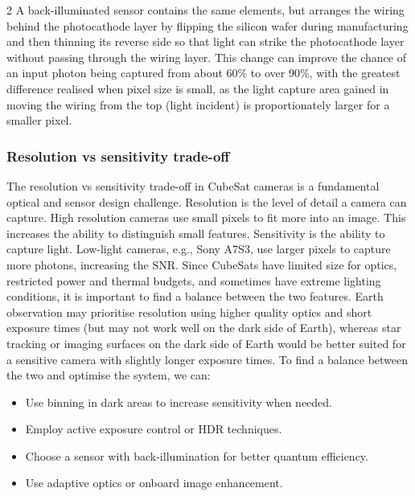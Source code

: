 \documentclass[10pt]{article}
\begin{document}
\begin{multicols}{2}
\newline \newline
A back-illuminated sensor contains the same elements, but arranges the wiring behind the photocathode layer by flipping the silicon wafer during manufacturing and then thinning its reverse side so that light can strike the photocathode layer without passing through the wiring layer.
This change can improve the chance of an input photon being captured from about 60\% to over 90\%, with the greatest difference realised when pixel size is small, as the light capture area gained in moving the wiring from the top (light incident) is proportionately larger for a smaller pixel.

\subsubsection{Resolution vs sensitivity trade-off}
The resolution vs sensitivity trade-off in CubeSat cameras is a fundamental optical and sensor design challenge.
\newline
Resolution is the level of detail a camera can capture. High resolution cameras use small pixels to fit more into an image. This increases the ability to distinguish small features.
\newline
Sensitivity is the ability to capture light. Low-light cameras, e.g., Sony A7S3, use larger pixels to capture more photons, increasing the SNR.
\newline
Since CubeSats have limited size for optics, restricted power and thermal budgets, and sometimes have extreme lighting conditions, it is important to find a balance between the two features.
Earth observation may prioritise resolution using higher quality optics and short exposure times (but may not work well on the dark side of Earth), whereas star tracking or imaging surfaces on the dark side of Earth would be better suited for a sensitive camera with slightly longer exposure times.
\newline \newline
To find a balance between the two and optimise the system, we can:
\begin{itemize}
    \item Use binning in dark areas to increase sensitivity when needed.
    \item Employ active exposure control or HDR techniques.
    \item Choose a sensor with back-illumination for better quantum efficiency.
    \item Use adaptive optics or onboard image enhancement.
\end{itemize}


\end{multicols}
\end{document}
